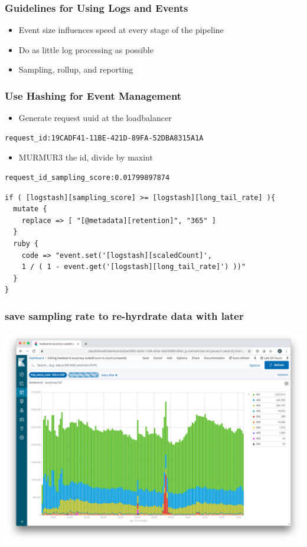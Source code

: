 \begin{frame}
    \frametitle{Guidelines for Using Logs and Events}
    \begin{itemize}
        \item Event size influences speed at every stage of the pipeline
        \item Do as little log processing as possible
        \item Sampling, rollup, and reporting
    \end{itemize}
\end{frame}

\begin{frame}[fragile]
    \frametitle{Use Hashing for Event Management}
    \begin{itemize}
        \item Generate request uuid at the loadbalancer
    \end{itemize}
    \begin{lstlisting}
request_id:19CADF41-11BE-421D-89FA-52DBA8315A1A
    \end{lstlisting}
    \begin{itemize}
        \item MURMUR3 the id, divide by maxint
    \end{itemize}
    \begin{lstlisting}
request_id_sampling_score:0.01799897874
    \end{lstlisting}

    \begin{lstlisting}
if ( [logstash][sampling_score] >= [logstash][long_tail_rate] ){
  mutate {
    replace => [ "[@metadata][retention]", "365" ]
  }
  ruby {
    code => "event.set('[logstash][scaledCount]',
    1 / ( 1 - event.get('[logstash][long_tail_rate]') ))"
  }
}
\end{lstlisting}
        
\end{frame}

\begin{frame}
    \frametitle{save sampling rate to re-hyrdrate data with later}
    \begin{center}
        \includegraphics[width=0.8\linewidth]{query-full.png}
    \end{center}
\end{frame}

